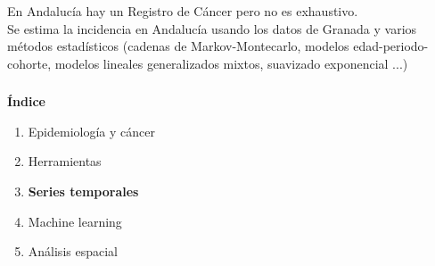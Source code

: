 \documentclass{beamer}
\begin{document}
\begin{frame}
\centering
En Andalucía hay un Registro de Cáncer pero no es exhaustivo.\\
Se estima la incidencia en Andalucía usando los datos de Granada y varios métodos estadísticos (cadenas de Markov-Montecarlo, modelos edad-periodo-cohorte, modelos lineales generalizados mixtos, suavizado exponencial ...)
	
\end{frame}

\begin{frame}\frametitle{}
	
	\Large{\textbf{Índice}}\\[2ex]
	\normalsize
	\begin{enumerate}
		\item Epidemiología y cáncer\\[2ex]
		\item Herramientas\\[2ex]
		\item \textbf{Series temporales} \\[2ex]
		\item Machine learning  \\[2ex]
		\item Análisis espacial \\[2ex]
	\end{enumerate}
	
\end{frame}

\end{document}
